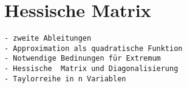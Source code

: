 %
%
%
\section{Hessische Matrix
\label{buch:fuvar:section:hessische}}

\begin{verbatim}
- zweite Ableitungen
- Approximation als quadratische Funktion
- Notwendige Bedinungen für Extremum
- Hessische  Matrix und Diagonalisierung
- Taylorreihe in n Variablen
\end{verbatim}
